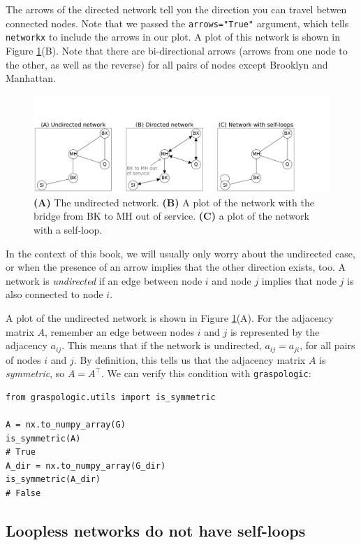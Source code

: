 The arrows of the directed network tell you the direction you can travel betwen connected nodes. Note that we passed the \texttt{arrows="True"} argument, which tells \texttt{networkx} to include the arrows in our plot. A plot of this network is shown in Figure \ref{fig:ch4:directed}(B). Note that there are bi-directional arrows (arrows from one node to the other, as well as the reverse) for all pairs of nodes except Brooklyn and Manhattan.

\begin{figure}[h]
    \centering
    \includegraphics[width=\linewidth]{representations/ch4/Images/directed.png}
    \caption[Comparing directed and undirected networks]{\textbf{(A)} The undirected network. \textbf{(B)} A plot of the network with the bridge from BK to MH out of service. \textbf{(C)} a plot of the network with a self-loop.}
    \label{fig:ch4:directed}
\end{figure}

In the context of this book, we will usually only worry about the undirected case, or when the presence of an arrow implies that the other direction exists, too. A network is \textit{undirected} if an edge between node $i$ and node $j$ implies that node $j$ is also connected to node $i$. 

A plot of the undirected network is shown in Figure \ref{fig:ch4:directed}(A). For the adjacency matrix $A$, remember an edge between nodes $i$ and $j$ is represented by the adjacency $a_{ij}$. This means that if the network is undirected, $a_{ij} = a_{ji}$, for all pairs of nodes $i$ and $j$. By definition, this tells us that the adjacency matrix $A$ is \textit{symmetric}, so $A = A^\top$. We can verify this condition with \texttt{graspologic}:
\begin{lstlisting}[style=python]
from graspologic.utils import is_symmetric

A = nx.to_numpy_array(G)
is_symmetric(A)
# True
A_dir = nx.to_numpy_array(G_dir)
is_symmetric(A_dir)
# False
\end{lstlisting}

\subsection{Loopless networks do not have self-loops}

